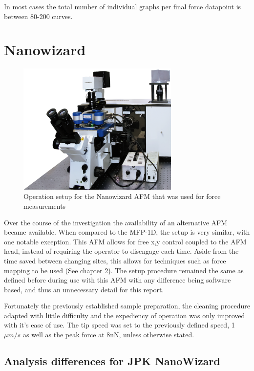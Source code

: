 In most cases the total number of individual graphs per final force datapoint is between 80-200 curves.

\newpage

\section{Nanowizard}

\begin{figure}[h!]     %
        \begin{center}
          \includegraphics[width=80mm]{chapter4/Nanowizard.png}
\end{center}
\caption{Operation setup for the Nanowizard AFM that was used for force measurements \cite{NWizardPic}}
\label{fig:Nanowizard.png}                 %
\end{figure}

Over the course of the investigation the availability of an alternative AFM became available. When compared to the MFP-1D, the setup is very similar, with one notable exception. This AFM allows for free x,y control coupled to the AFM head, instead of requiring the operator to disengage each time. Aside from the time saved between changing sites, this allows for techniques such as force mapping to be used (See chapter 2). The setup procedure remained the same as defined before during use with this AFM with any difference being software based, and thus an unnecessary detail for this report. 

Fortunately the previously established sample preparation, the cleaning procedure adapted with little difficulty and the expediency of operation was only improved with it's ease of use. The tip speed was set to the previously defined speed, 1$\mu m/s$ as well as the peak force at 8nN, unless otherwise stated.

\subsection{Analysis differences for JPK NanoWizard} %

